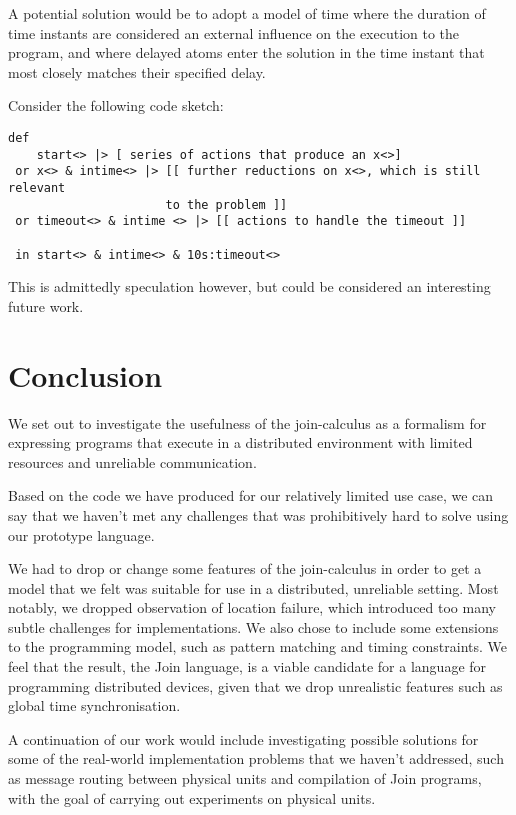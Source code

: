 A potential solution would be to adopt a model of time where the duration of
time instants are considered an external influence on the execution to the
program, and where delayed atoms enter the solution in the time instant that
most closely matches their specified delay.

Consider the following code sketch:
\begin{verbatim}
def
    start<> |> [ series of actions that produce an x<>]
 or x<> & intime<> |> [[ further reductions on x<>, which is still relevant
                      to the problem ]]
 or timeout<> & intime <> |> [[ actions to handle the timeout ]]

 in start<> & intime<> & 10s:timeout<>
\end{verbatim}

This is admittedly speculation however, but could be considered an interesting
future work.

\section{Conclusion}
We set out to investigate the usefulness of the join-calculus as a
formalism for expressing programs that execute in a distributed environment with
limited resources and unreliable communication.

Based on the code we have produced for our relatively limited use case, we can
say that we haven't met any challenges that was prohibitively hard to solve
using our prototype language.

We had to drop or change some features of the join-calculus in order to get a
model that we felt was suitable for use in a distributed, unreliable setting.
Most notably, we dropped observation of location failure, which introduced too
many subtle challenges for implementations. We also chose to include some
extensions to the programming model, such as pattern matching and timing
constraints. We feel that the result, the Join language, is a viable candidate
for a language for programming distributed devices, given that we drop
unrealistic features such as global time synchronisation.

A continuation of our work would include investigating possible solutions for
some of the real-world implementation problems that we haven't addressed, such
as message routing between physical units and compilation of Join programs, with
the goal of carrying out experiments on physical units.
